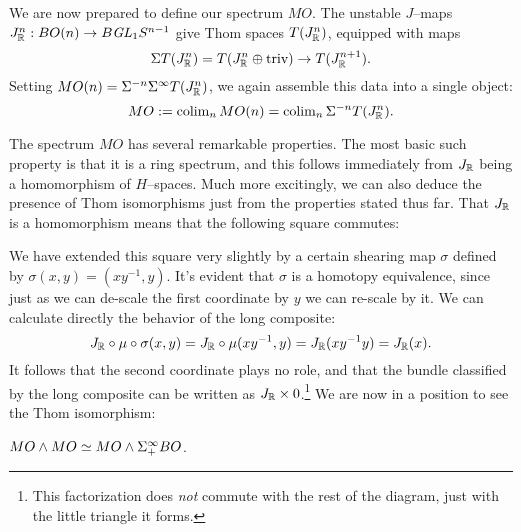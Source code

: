 We are now prepared to define our spectrum $MO$.  The unstable $J$--maps $J_{\mathbb R}^n: BO(n) \to B\mathit{GL}_1 S^{n-1}$ give Thom spaces $T(J_{\mathbb R}^n)$, equipped with maps \[\Sigma T(J_{\mathbb R}^n) = T(J_{\mathbb R}^n \oplus \text{triv}) \to T(J_{\mathbb R}^{n+1}).\] Setting $MO(n) = \Sigma^{-n} \Sigma^\infty T(J_{\mathbb R}^n)$, we again assemble this data into a single object: \[MO := \operatorname{colim}_n MO(n) = \operatorname{colim}_n \Sigma^{-n} T(J_{\mathbb R}^n).\]

The spectrum $MO$ has several remarkable properties.  The most basic such property is that it is a ring spectrum, and this follows immediately from $J_{\mathbb R}$ being a homomorphism of $H$--spaces.  Much more excitingly, we can also deduce the presence of Thom isomorphisms just from the properties stated thus far.  That $J_{\mathbb R}$ is a homomorphism means that the following square commutes:
\begin{center}
\end{center}
We have extended this square very slightly by a certain shearing map $\sigma$ defined by $\sigma(x, y) = (xy^{-1}, y)$.  It's evident that $\sigma$ is a homotopy equivalence, since just as we can de-scale the first coordinate by $y$ we can re-scale by it.  We can calculate directly the behavior of the long composite: \[J_{\mathbb R} \circ \mu \circ \sigma(x, y) = J_{\mathbb R} \circ \mu(xy^{-1}, y) = J_{\mathbb R}(xy^{-1}y) = J_{\mathbb R}(x).\]  It follows that the second coordinate plays no role, and that the bundle classified by the long composite can be written as $J_{\mathbb R} \times 0$.\footnote{This factorization does \emph{not} commute with the rest of the diagram, just with the little triangle it forms.}  We are now in a position to see the Thom isomorphism:
\begin{lemma} $MO \wedge MO \simeq MO \wedge \Sigma^\infty_+ BO$.
\end{lemma}
